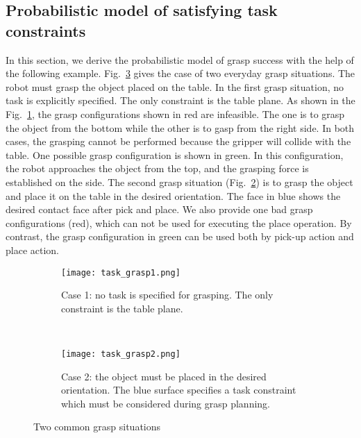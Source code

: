 \subsection{Probabilistic model of satisfying task constraints}
In this section, we derive the probabilistic model of grasp success with the help of the following example. Fig.~\ref{fig:task_grasp_12} gives the case of two everyday grasp situations. The robot must grasp the object placed on the table. In the first grasp situation, no task is explicitly specified. The only constraint is the table plane.  As shown in the Fig.~\ref{fig:task_grasp1}, the grasp configurations shown in red are infeasible. The one is to grasp the object from the bottom while the other is to gasp from the right side. In both cases, the grasping cannot be performed because the gripper will collide with the table.  One possible grasp configuration is shown in green. In this configuration, the robot approaches the object from the top, and the grasping force is established on the side. The second grasp situation (Fig.~\ref{fig:task_grasp2}) is to grasp the object and place it on the table in the desired orientation. The face in blue shows the desired contact face after pick and place. We also provide one bad grasp configurations (red), which can not be used for executing the place operation. By contrast, the grasp configuration in green can be used both by pick-up action and place action. 
\begin{figure}[!htbp]
\captionsetup[subfigure]{position=b}
    \centering
    \begin{subfigure}[t]{0.45\textwidth}
        \texttt{[image: task\_grasp1.png]}
        \caption{Case 1: no task is specified for grasping. The only constraint is the table plane.}
        \label{fig:task_grasp1}
    \end{subfigure}
    ~
    \begin{subfigure}[t]{0.45\textwidth}
        \texttt{[image: task\_grasp2.png]}
        \caption{Case 2: the object must be placed in the desired orientation. The blue surface specifies a task constraint which must be considered during grasp planning.}
        \label{fig:task_grasp2}
    \end{subfigure}
    \caption{Two common grasp situations}\label{fig:task_grasp_12}
\end{figure}

